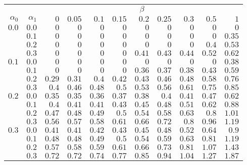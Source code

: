 \begin{tabular}{rr|rrrrrrrrr}
\hline\hline
 && \multicolumn{9}{c}{$\beta$}\\
 $\alpha_0$ & $\alpha_1$ & $0$ & $0.05$ & $0.1$ & $0.15$ & $0.2$ & $0.25$ & $0.3$ & $0.5$ & $1$ \\ 
 \hline
$0.0$ & $0.0$ & $0$ & $0$ & $0$ & $0$ & $0$ & $0$ & $0$ & $0$ & $0$\\ 
 & $0.1$ & $0$ & $0$ & $0$ & $0$ & $0$ & $0$ & $0$ & $0$ & $0.35$\\ 
 & $0.2$ & $0$ & $0$ & $0$ & $0$ & $0$ & $0$ & $0$ & $0.4$ & $0.53$\\ 
 & $0.3$ & $0$ & $0$ & $0$ & $0$ & $0.41$ & $0.43$ & $0.44$ & $0.52$ & $0.62$\\ 
\hline 
 $0.1$ & $0.0$ & $0$ & $0$ & $0$ & $0$ & $0$ & $0$ & $0$ & $0$ & $0.38$\\ 
 & $0.1$ & $0$ & $0$ & $0$ & $0$ & $0.36$ & $0.37$ & $0.38$ & $0.43$ & $0.59$\\ 
 & $0.2$ & $0.29$ & $0.31$ & $0.4$ & $0.42$ & $0.43$ & $0.46$ & $0.48$ & $0.58$ & $0.76$\\ 
 & $0.3$ & $0.4$ & $0.46$ & $0.48$ & $0.5$ & $0.53$ & $0.56$ & $0.61$ & $0.75$ & $0.85$\\ 
\hline 
 $0.2$ & $0.0$ & $0.35$ & $0.35$ & $0.36$ & $0.37$ & $0.38$ & $0.4$ & $0.41$ & $0.47$ & $0.62$\\ 
 & $0.1$ & $0.4$ & $0.41$ & $0.41$ & $0.43$ & $0.45$ & $0.48$ & $0.51$ & $0.62$ & $0.88$\\ 
 & $0.2$ & $0.47$ & $0.48$ & $0.49$ & $0.5$ & $0.54$ & $0.58$ & $0.63$ & $0.8$ & $1.01$\\ 
 & $0.3$ & $0.56$ & $0.57$ & $0.58$ & $0.61$ & $0.66$ & $0.72$ & $0.8$ & $0.96$ & $1.19$\\ 
\hline 
 $0.3$ & $0.0$ & $0.41$ & $0.41$ & $0.42$ & $0.43$ & $0.45$ & $0.48$ & $0.52$ & $0.64$ & $0.9$\\ 
 & $0.1$ & $0.48$ & $0.48$ & $0.49$ & $0.5$ & $0.54$ & $0.59$ & $0.63$ & $0.81$ & $1.19$\\ 
 & $0.2$ & $0.57$ & $0.58$ & $0.59$ & $0.61$ & $0.66$ & $0.73$ & $0.81$ & $1.07$ & $1.43$\\ 
 & $0.3$ & $0.72$ & $0.72$ & $0.74$ & $0.77$ & $0.85$ & $0.94$ & $1.04$ & $1.27$ & $1.87$\\ 
 \hline 
 \end{tabular}